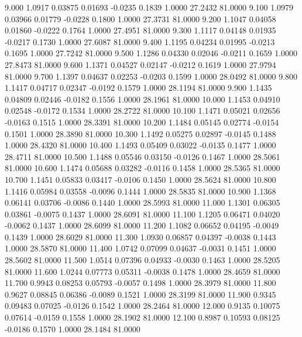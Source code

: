    9.000   1.0917   0.03875   0.01693  -0.0235   0.1839   1.0000  27.2432  81.0000
   9.100   1.0979   0.03966   0.01779  -0.0228   0.1800   1.0000  27.3731  81.0000
   9.200   1.1047   0.04058   0.01860  -0.0222   0.1764   1.0000  27.4951  81.0000
   9.300   1.1117   0.04148   0.01935  -0.0217   0.1730   1.0000  27.6087  81.0000
   9.400   1.1195   0.04234   0.01995  -0.0213   0.1695   1.0000  27.7242  81.0000
   9.500   1.1286   0.04330   0.02046  -0.0211   0.1659   1.0000  27.8473  81.0000
   9.600   1.1371   0.04527   0.02147  -0.0212   0.1619   1.0000  27.9794  81.0000
   9.700   1.1397   0.04637   0.02253  -0.0203   0.1599   1.0000  28.0492  81.0000
   9.800   1.1417   0.04717   0.02347  -0.0192   0.1579   1.0000  28.1194  81.0000
   9.900   1.1435   0.04809   0.02446  -0.0182   0.1556   1.0000  28.1961  81.0000
  10.000   1.1453   0.04910   0.02548  -0.0172   0.1534   1.0000  28.2722  81.0000
  10.100   1.1471   0.05021   0.02656  -0.0163   0.1515   1.0000  28.3391  81.0000
  10.200   1.1484   0.05145   0.02774  -0.0154   0.1501   1.0000  28.3890  81.0000
  10.300   1.1492   0.05275   0.02897  -0.0145   0.1488   1.0000  28.4320  81.0000
  10.400   1.1493   0.05409   0.03022  -0.0135   0.1477   1.0000  28.4711  81.0000
  10.500   1.1488   0.05546   0.03150  -0.0126   0.1467   1.0000  28.5061  81.0000
  10.600   1.1474   0.05688   0.03282  -0.0116   0.1458   1.0000  28.5365  81.0000
  10.700   1.1451   0.05833   0.03417  -0.0106   0.1450   1.0000  28.5624  81.0000
  10.800   1.1416   0.05984   0.03558  -0.0096   0.1444   1.0000  28.5835  81.0000
  10.900   1.1368   0.06141   0.03706  -0.0086   0.1440   1.0000  28.5993  81.0000
  11.000   1.1301   0.06305   0.03861  -0.0075   0.1437   1.0000  28.6091  81.0000
  11.100   1.1205   0.06471   0.04020  -0.0062   0.1437   1.0000  28.6099  81.0000
  11.200   1.1082   0.06652   0.04195  -0.0049   0.1439   1.0000  28.6029  81.0000
  11.300   1.0930   0.06857   0.04397  -0.0038   0.1443   1.0000  28.5870  81.0000
  11.400   1.0742   0.07099   0.04637  -0.0031   0.1451   1.0000  28.5602  81.0000
  11.500   1.0514   0.07396   0.04933  -0.0030   0.1463   1.0000  28.5205  81.0000
  11.600   1.0244   0.07773   0.05311  -0.0038   0.1478   1.0000  28.4659  81.0000
  11.700   0.9943   0.08253   0.05793  -0.0057   0.1498   1.0000  28.3979  81.0000
  11.800   0.9627   0.08845   0.06386  -0.0089   0.1521   1.0000  28.3199  81.0000
  11.900   0.9345   0.09483   0.07025  -0.0126   0.1542   1.0000  28.2464  81.0000
  12.000   0.9135   0.10075   0.07614  -0.0159   0.1558   1.0000  28.1902  81.0000
  12.100   0.8987   0.10593   0.08125  -0.0186   0.1570   1.0000  28.1484  81.0000
